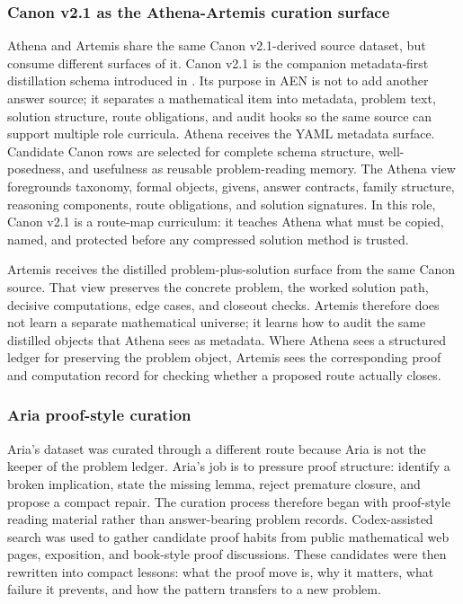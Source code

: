\documentclass[11pt]{article}
\begin{document}
\subsubsection{Canon v2.1 as the Athena-Artemis curation surface}

Athena and Artemis share the same Canon v2.1-derived source dataset, but consume different surfaces of it. Canon v2.1 is the companion metadata-first distillation schema introduced in \citet{paudel2026canon}. Its purpose in AEN is not to add another answer source; it separates a mathematical item into metadata, problem text, solution structure, route obligations, and audit hooks so the same source can support multiple role curricula. Athena receives the YAML metadata surface. Candidate Canon rows are selected for complete schema structure, well-posedness, and usefulness as reusable problem-reading memory. The Athena view foregrounds taxonomy, formal objects, givens, answer contracts, family structure, reasoning components, route obligations, and solution signatures. In this role, Canon v2.1 is a route-map curriculum: it teaches Athena what must be copied, named, and protected before any compressed solution method is trusted.

Artemis receives the distilled problem-plus-solution surface from the same Canon source. That view preserves the concrete problem, the worked solution path, decisive computations, edge cases, and closeout checks. Artemis therefore does not learn a separate mathematical universe; it learns how to audit the same distilled objects that Athena sees as metadata. Where Athena sees a structured ledger for preserving the problem object, Artemis sees the corresponding proof and computation record for checking whether a proposed route actually closes.

\subsubsection{Aria proof-style curation}

Aria's dataset was curated through a different route because Aria is not the keeper of the problem ledger. Aria's job is to pressure proof structure: identify a broken implication, state the missing lemma, reject premature closure, and propose a compact repair. The curation process therefore began with proof-style reading material rather than answer-bearing problem records. Codex-assisted search was used to gather candidate proof habits from public mathematical web pages, exposition, and book-style proof discussions. These candidates were then rewritten into compact lessons: what the proof move is, why it matters, what failure it prevents, and how the pattern transfers to a new problem.
\end{document}
